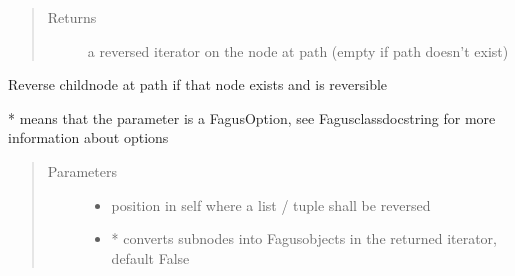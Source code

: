 \documentclass[a4paper,10pt,english]{sphinxmanual}
\begin{document}
\begin{fulllineitems}
\begin{fulllineitems}
\begin{quote}
\begin{description}
\begin{itemize}
\end{itemize}

\item[{Returns}] \leavevmode
\sphinxAtStartPar
a reversed iterator on the node at path (empty if path doesn’t exist)

\end{description}\end{quote}

\end{fulllineitems}


\begin{fulllineitems}
\label{\detokenize{fagus:fagus.Fagus.reverse}}
\pysigstartsignatures
{}
\pysigstopsignatures
\sphinxAtStartPar
Reverse child\sphinxhyphen{}node at path if that node exists and is reversible

\sphinxAtStartPar
* means that the parameter is a FagusOption, see Fagus\sphinxhyphen{}class\sphinxhyphen{}docstring for more information about options
\begin{quote}\begin{description}
\item[{Parameters}] \leavevmode\begin{itemize}
\item {}
\sphinxAtStartPar
{} \textendash{} position in self where a list / tuple shall be reversed

\item {}
\sphinxAtStartPar
{} \textendash{} * converts sub\sphinxhyphen{}nodes into Fagus\sphinxhyphen{}objects in the returned iterator, default False


\end{itemize}
\end{description}
\end{quote}
\end{fulllineitems}
\end{fulllineitems}
\end{document}
